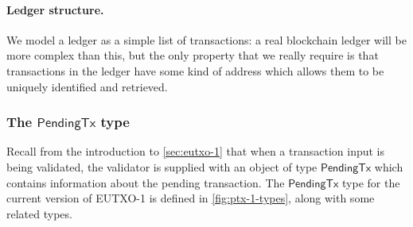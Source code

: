 \documentclass[a4paper]{article}
\newcommand{\s}{\textsf}  %
\newcommand{\ptx}{\ensuremath{\s{PendingTx}}}
\begin{document}
\paragraph{Ledger structure.} We model a ledger as a simple
list of transactions: a real blockchain ledger will be more complex
than this, but the only property that we really require is that
transactions in the ledger have some kind of address which allows them
to be uniquely identified and retrieved.

\subsubsection{The \ptx{} type}
\label{sec:pendingtx}
Recall from the introduction to \cref{sec:eutxo-1} that when a
transaction input is being validated, the validator is supplied
with an object of type \ptx{} which contains information about the
pending transaction.  The \ptx{} type for the current version of
EUTXO-1 is defined in \cref{fig:ptx-1-types}, along with some
related types.
\end{document}
